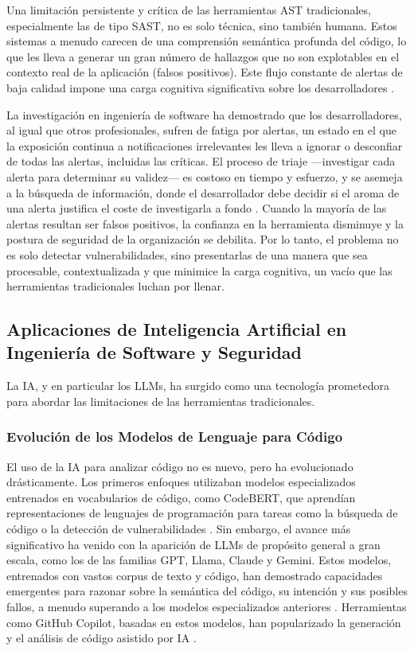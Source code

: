 Una limitación persistente y crítica de las herramientas AST tradicionales, especialmente las de tipo SAST, no es solo técnica, sino también humana. Estos sistemas a menudo carecen de una comprensión semántica profunda del código, lo que les lleva a generar un gran número de hallazgos que no son explotables en el contexto real de la aplicación (falsos positivos). Este flujo constante de alertas de baja calidad impone una carga cognitiva significativa sobre los desarrolladores \cite{Johnson2023UsabilitySAST}.

La investigación en ingeniería de software ha demostrado que los desarrolladores, al igual que otros profesionales, sufren de fatiga por alertas, un estado en el que la exposición continua a notificaciones irrelevantes les lleva a ignorar o desconfiar de todas las alertas, incluidas las críticas. El proceso de triaje —investigar cada alerta para determinar su validez— es costoso en tiempo y esfuerzo, y se asemeja a la búsqueda de información, donde el desarrollador debe decidir si el aroma de una alerta justifica el coste de investigarla a fondo \cite{Parnin2011InformationForaging}. Cuando la mayoría de las alertas resultan ser falsos positivos, la confianza en la herramienta disminuye y la postura de seguridad de la organización se debilita. Por lo tanto, el problema no es solo detectar vulnerabilidades, sino presentarlas de una manera que sea procesable, contextualizada y que minimice la carga cognitiva, un vacío que las herramientas tradicionales luchan por llenar.

\subsection{Aplicaciones de Inteligencia Artificial en Ingeniería de Software y Seguridad}

La IA, y en particular los LLMs, ha surgido como una tecnología prometedora para abordar las limitaciones de las herramientas tradicionales.

\subsubsection{Evolución de los Modelos de Lenguaje para Código}

El uso de la IA para analizar código no es nuevo, pero ha evolucionado drásticamente. Los primeros enfoques utilizaban modelos especializados entrenados en vocabularios de código, como CodeBERT, que aprendían representaciones de lenguajes de programación para tareas como la búsqueda de código o la detección de vulnerabilidades \cite{Chen2020CodeBERT}. Sin embargo, el avance más significativo ha venido con la aparición de LLMs de propósito general a gran escala, como los de las familias GPT, Llama, Claude y Gemini. Estos modelos, entrenados con vastos corpus de texto y código, han demostrado capacidades emergentes para razonar sobre la semántica del código, su intención y sus posibles fallos, a menudo superando a los modelos especializados anteriores \cite{Siddiq2024LLMSurvey}. Herramientas como GitHub Copilot, basadas en estos modelos, han popularizado la generación y el análisis de código asistido por IA \cite{GitHubCopilotFeatures, Wang2022CopilotSecurity}.

